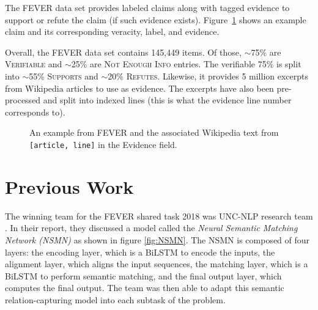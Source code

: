 \documentclass[11pt,a4paper]{article}
\begin{document}
The FEVER data set provides labeled claims along with tagged evidence to support or refute the claim (if such evidence exists). Figure~\ref{fig:fever-example} shows an example claim and its corresponding veracity, label, and evidence.

Overall, the FEVER data set contains 145,449 items. Of those,  $\sim$75\% are \textsc{Verifiable} and $\sim$25\% are \textsc{Not Enough Info} entries. The verifiable 75\% is split into $\sim$55\% \textsc{Supports} and $\sim$20\% \textsc{Refutes}. Likewise, it provides 5 million excerpts from Wikipedia articles to use as evidence. The excerpts have also been pre-processed and split into indexed lines (this is what the evidence line number corresponds to).


\begin{figure}
  \begin{framed}
  \end{framed}
  \caption{An example from FEVER and the associated Wikipedia text from \texttt{[article, line]}
    in the Evidence field.}
  \label{fig:fever-example}
\end{figure}


\section{Previous Work}
The winning team for the FEVER shared task 2018 was UNC-NLP research team \cite{unc2018}. In their report, they discussed a model called the \textit{Neural Semantic Matching Network (NSMN)} as shown in figure \ref{fig:NSMN}. The NSMN is composed of four layers: the encoding layer, which is a BiLSTM to encode the inputs, the alignment layer, which aligns the input sequences, the matching layer, which is a BiLSTM to perform semantic matching, and the final output layer, which computes the final output. The team was then able to adapt this semantic relation-capturing model into each subtask of the problem.
\end{document}
